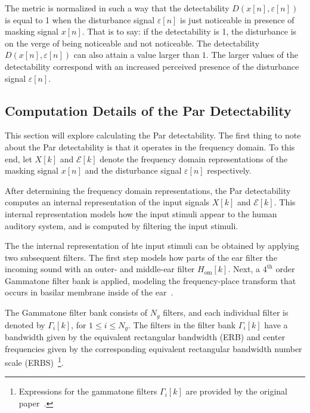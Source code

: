 The metric is normalized in such a way that the detectability $D(x[n],\varepsilon[n])$ is equal to 1 when the 
disturbance signal $\varepsilon[n]$ is just noticeable in presence of masking signal $x[n]$.
That is to say: if the detectability is 1, the disturbance is on the verge of being noticeable and not noticeable.
The detectability $D(x[n],\varepsilon[n])$ can also attain a value larger than $1$.
The larger values of the detectability correspond with an increased perceived presence of the
disturbance signal $\varepsilon[n]$.

\subsection{Computation Details of the Par Detectability}
\label{ch:perceptual:implementation:computation}
This section will explore calculating the Par detectability.
The first thing to note about the Par detectability is that it operates in the frequency domain. 
To this end, let $X[k]$ and $\mathcal{E}[k]$ denote the frequency domain representations of the masking signal $x[n]$ and 
the disturbance signal $\varepsilon[n]$ respectively.

After determining the frequency domain representations, the Par detectability computes an internal representation of the input signals $X[k]$ and $\mathcal{E}[k]$.
This internal representation models how the input stimuli appear to the human auditory system, and is computed by filtering the input stimuli.

The the internal representation of hte input stimuli can be obtained by applying two subsequent filters.
The first step models how parts of the ear filter the incoming sound with an outer- and middle-ear filter $H_\text{om}[k]$. 
Next, a $4^\text{th}$ order Gammatone filter bank is applied, modeling the frequency-place transform that occurs in 
basilar membrane inside of the ear~\cite{van2005perceptual}.

The Gammatone filter bank consists of $N_g$ filters, and each individual filter is denoted by $\Gamma_i[k]$, for $1 \leq i \leq N_g$. 
The filters in the filter bank $\Gamma_i[k]$ have a bandwidth given by the equivalent 
rectangular bandwidth (ERB) and center frequencies given by the corresponding equivalent rectangular bandwidth number
scale (ERBS)~\footnote{Expressions for the gammatone filters $\Gamma_i[k]$ are provided by the original paper~\cite{van2005perceptual}.}.

